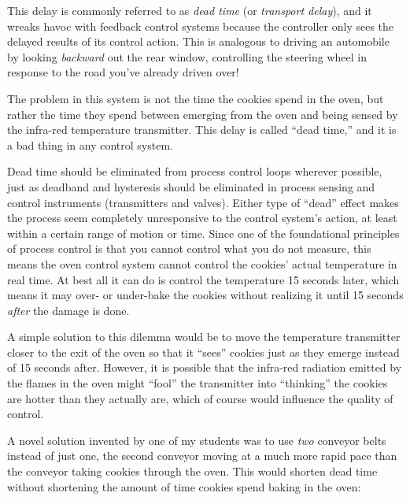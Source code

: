 This delay is commonly referred to as {\it dead time} (or {\it transport delay}), and it wreaks havoc with feedback control systems because the controller only sees the delayed results of its control action.  This is analogous to driving an automobile by looking {\it backward} out the rear window, controlling the steering wheel in response to the road you've already driven over!







The problem in this system is not the time the cookies spend in the oven, but rather the time they spend between emerging from the oven and being sensed by the infra-red temperature transmitter.  This delay is called ``dead time,'' and it is a bad thing in any control system.

Dead time should be eliminated from process control loops wherever possible, just as deadband and hysteresis should be eliminated in process sensing and control instruments (transmitters and valves).  Either type of ``dead'' effect makes the process seem completely unresponsive to the control system's action, at least within a certain range of motion or time.  Since one of the foundational principles of process control is that you cannot control what you do not measure, this means the oven control system cannot control the cookies' actual temperature in real time.  At best all it can do is control the temperature 15 seconds later, which means it may over- or under-bake the cookies without realizing it until 15 seconds {\it after} the damage is done.

\vskip 10pt

A simple solution to this dilemma would be to move the temperature transmitter closer to the exit of the oven so that it ``sees'' cookies just as they emerge instead of 15 seconds after.  However, it is possible that the infra-red radiation emitted by the flames in the oven might ``fool'' the transmitter into ``thinking'' the cookies are hotter than they actually are, which of course would influence the quality of control.

A novel solution invented by one of my students was to use {\it two} conveyor belts instead of just one, the second conveyor moving at a much more rapid pace than the conveyor taking cookies through the oven.  This would shorten dead time without shortening the amount of time cookies spend baking in the oven:


